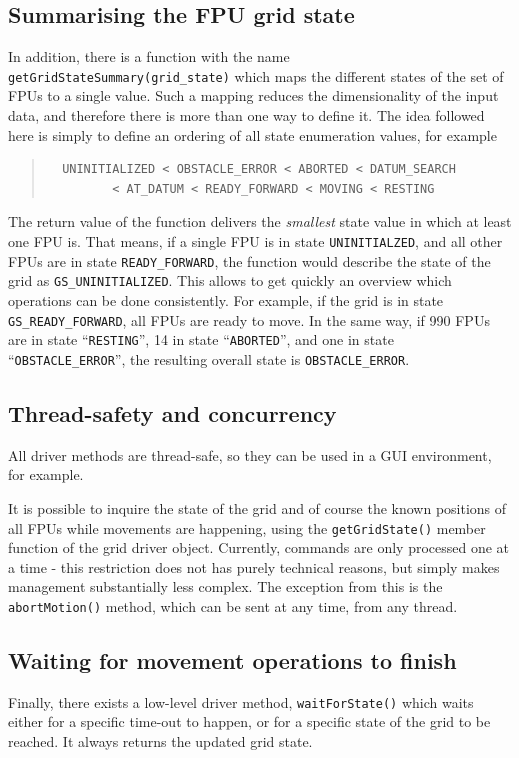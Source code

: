 \documentclass[11pt,a4paper]{scrartcl}
\begin{document}
\subsection{Summarising the FPU grid state}
In addition, there is a function with the name
\texttt{getGridStateSummary(grid\_state)} which maps the different
states of the set of FPUs to a single value. Such a mapping reduces
the dimensionality of the input data, and therefore there is more than
one way to define it. The idea followed here is simply to define an
ordering of all state enumeration values, for example
\begin{quote}
\begin{verbatim}
  UNINITIALIZED < OBSTACLE_ERROR < ABORTED < DATUM_SEARCH
         < AT_DATUM < READY_FORWARD < MOVING < RESTING
\end{verbatim}
\end{quote}

The return value of the function delivers the \emph{smallest} state
value in which at least one FPU is.  That means, if a single FPU is in
state \texttt{UNINITIALZED}, and all other FPUs are in state
\texttt{READY\_FORWARD}, the function would describe the state of the
grid as \texttt{GS\_UNINITIALIZED}. This allows to get quickly an
overview which operations can be done consistently. For example, if
the grid is in state \texttt{GS\_READY\_FORWARD}, all FPUs are ready
to move. In the same way, if 990 FPUs are in state ``\texttt{RESTING}'',
14 in state ``\texttt{ABORTED}'', and one in state ``\texttt{OBSTACLE\_ERROR}'',
the resulting overall state is \texttt{OBSTACLE\_ERROR}.


\subsection{Thread-safety and concurrency}
All driver methods are thread-safe, so they can be used in a GUI
environment, for example.

It is possible to inquire the state of the grid and of course the
known positions of all FPUs while movements are happening, using the
\texttt{getGridState()} member function of the grid driver
object. Currently, commands are only processed one at a time - this
restriction does not has purely technical reasons, but simply makes
management substantially less complex. The exception from this is the
\texttt{abortMotion()} method, which can be sent at any time, from any
thread.

\subsection{Waiting for movement operations to finish}
Finally, there exists a low-level driver method,
\texttt{waitForState()} which waits either for a specific time-out to
happen, or for a specific state of the grid to be reached. It always
returns the updated grid state.
\end{document}
